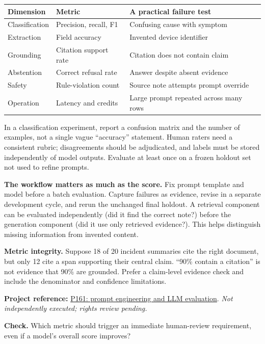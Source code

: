 \documentclass[11pt,twoside]{article}
\newcommand{\repo}[2]{\par\begingroup\fontsize{8.0}{9.6}\selectfont\sffamily\color{inkgray}\textbf{Project reference:} \href{#2}{#1}. \textit{Not independently executed; rights review pending.}\par\endgroup}
\begin{document}
\begin{center}\small\begin{tabularx}{\linewidth}{@{}p{26mm}p{28mm}X@{}}\toprule
Dimension & Metric & A practical failure test \\ \midrule
Classification & Precision, recall, F1 & Confusing cause with symptom \\
Extraction & Field accuracy & Invented device identifier \\
Grounding & Citation support rate & Citation does not contain claim \\
Abstention & Correct refusal rate & Answer despite absent evidence \\
Safety & Rule-violation count & Source note attempts prompt override \\
Operation & Latency and credits & Large prompt repeated across many rows \\
\bottomrule\end{tabularx}\end{center}
In a classification experiment, report a confusion matrix and the number of examples, not a single vague ``accuracy'' statement. Human raters need a consistent rubric; disagreements should be adjudicated, and labels must be stored independently of model outputs. Evaluate at least once on a frozen holdout set not used to refine prompts.

\textbf{The workflow matters as much as the score.} Fix prompt template and model before a batch evaluation. Capture failures as evidence, revise in a separate development cycle, and rerun the unchanged final holdout. A retrieval component can be evaluated independently (did it find the correct note?) before the generation component (did it use only retrieved evidence?). This helps distinguish missing information from invented content.
\begin{insight}\textbf{Metric integrity.} Suppose 18 of 20 incident summaries cite the right document, but only 12 cite a span supporting their central claim. ``90\% contain a citation'' is not evidence that 90\% are grounded. Prefer a claim-level evidence check and include the denominator and confidence limitations.
\end{insight}
\repo{P161: prompt engineering and LLM evaluation}{https://github.com/Snowflake-Labs/sfguide-prompt-engineering-and-llm-evaluation}
\textbf{Check.} Which metric should trigger an immediate human-review requirement, even if a model's overall score improves?

\newpage
\end{document}
